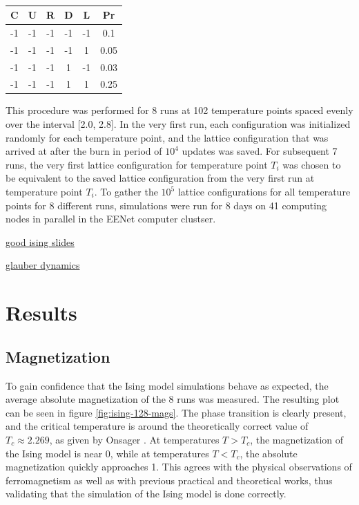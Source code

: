 \documentclass[12pt]{article}
\begin{document}
\begin{table}[h!]
\centering
\begin{tabular}{|c|c|c|c|c|c|}
	\hline
	C & U & R & D & L & Pr\\ 
	\hline
	-1 & -1 & -1 & -1 & -1 & 0.1 \\
	-1 & -1 & -1 & -1 & 1 & 0.05 \\
	-1 & -1 & -1 & 1 & -1 & 0.03 \\
	-1 & -1 & -1 & 1 & 1 & 0.25 \\
	 
\end{tabular}
\caption{}
\label{table:3}
\end{table}

This procedure was performed for 8 runs at 102 temperature points spaced evenly over the interval [2.0, 2.8]. In the very first run, each configuration was initialized randomly for each temperature point, and the lattice configuration that was arrived at after the burn in period of $10^4$ updates was saved. For subsequent 7 runs, the very first lattice configuration for temperature point $T_i$ was chosen to be equivalent to the saved lattice configuration from the very first run at temperature point $T_i$. To gather the $10^5$ lattice configurations for all temperature points for 8 different runs, simulations were run for 8 days on 41 computing nodes in parallel in the EENet computer clustser.


\href{http://web.mit.edu/krish_s/www/files/ising_Model.pdf}{good ising slides}

\href{http://www.hermetic.ch/compsci/thesis/contents.htm}{glauber dynamics}

\newpage
\section{Results}

\subsection{Magnetization} 

To gain confidence that the Ising model simulations behave as expected, the average absolute magnetization of the 8 runs was measured. The resulting plot can be seen in figure \ref{fig:ising-128-mags}. The phase transition is clearly present, and the critical temperature is around the theoretically correct value of $T_c \approx 2.269$, as given by Onsager \cite{lars-onsanger}. At temperatures $T > T_c$, the magnetization of the Ising model is near 0, while at temperatures $T < T_c$, the absolute magnetization quickly approaches 1. This agrees with the physical observations of ferromagnetism as well as with previous practical and theoretical works, thus validating that the simulation of the Ising model is done correctly. 
\end{document}
